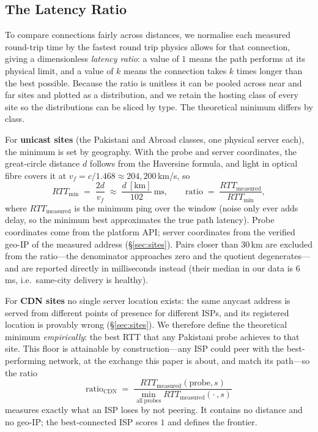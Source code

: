 \documentclass[sigconf,anonymous,10pt]{acmart}
\begin{document}
\subsection{The Latency Ratio}
\label{sec:ratio}
To compare connections fairly across distances, we normalise each measured round-trip time by the
fastest round trip physics allows for that connection, giving a dimensionless \emph{latency
ratio}: a value of $1$ means the path performs at its physical limit, and a value of $k$ means the
connection takes $k$ times longer than the best possible. Because the ratio is unitless it can be
pooled across near and far sites and plotted as a distribution, and we retain the hosting class of
every site so the distributions can be sliced by type. The theoretical minimum differs by class.

For \textbf{unicast sites} (the Pakistani and Abroad classes, one physical server each), the
minimum is set by geography. With the probe and server coordinates, the great-circle distance $d$
follows from the Haversine formula, and light in optical fibre covers it at
$v_f = c/1.468 \approx 204{,}200$\,km/s, so
\begin{equation}
  \mathit{RTT}_{\min} \;=\; \frac{2d}{v_f} \;\approx\; \frac{d~[\mathrm{km}]}{102}~\mathrm{ms},
  \qquad
  \text{ratio} \;=\; \frac{\mathit{RTT}_{\mathrm{measured}}}{\mathit{RTT}_{\min}},
\end{equation}
where $\mathit{RTT}_{\mathrm{measured}}$ is the minimum ping over the window (noise only ever adds
delay, so the minimum best approximates the true path latency). Probe coordinates come from the
platform API; server coordinates from the verified geo-IP of the measured address
(\S\ref{sec:sites}). Pairs closer than 30\,km are excluded from the ratio---the denominator
approaches zero and the quotient degenerates---and are reported directly in milliseconds instead
(their median in our data is 6\,ms, i.e.\ same-city delivery is healthy).

For \textbf{CDN sites} no single server location exists: the same anycast address is served from
different points of presence for different ISPs, and its registered location is provably wrong
(\S\ref{sec:sites}). We therefore define the theoretical minimum \emph{empirically}: the best RTT
that any Pakistani probe achieves to that site. This floor is attainable by construction---any ISP
could peer with the best-performing network, at the exchange this paper is about, and match its
path---so the ratio
\begin{equation}
  \text{ratio}_{\mathrm{CDN}} \;=\;
  \frac{\mathit{RTT}_{\mathrm{measured}}(\mathrm{probe}, s)}
       {\min_{\mathrm{all\ probes}} \mathit{RTT}_{\mathrm{measured}}(\cdot\,, s)}
\end{equation}
measures exactly what an ISP loses by not peering. It contains no distance and no geo-IP; the
best-connected ISP scores $1$ and defines the frontier.
\end{document}

